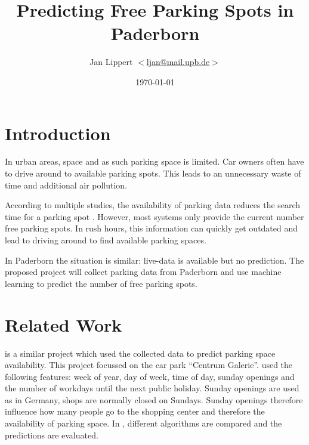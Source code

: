 \documentclass[journal,10pt]{IEEEtran}
\title{Predicting Free Parking Spots in Paderborn}
\author{Jan Lippert \(<\)\href{mailt:ljan@mail.upb.de}{ljan@mail.upb.de}\(>\)}
\date{\today}
\begin{document}
\maketitle

\section{Introduction}

In urban areas, space and as such parking space is limited. Car owners often have to drive around to available parking spots. This leads to an unnecessary waste of time and additional air pollution. 

According to multiple studies, the availability of parking data reduces the search time for a parking spot \cite{Asakura1994}\cite{Caicedo2010228}. However, most systems only provide the current number free parking spots. In rush hours, this information can quickly get outdated and lead to driving around to find available parking spaces.


In Paderborn the situation is similar: live-data is available but no prediction. The proposed project will collect parking data from Paderborn and use machine learning to predict the number of free parking spots.



\section{Related Work}

\cite{parkendd} is a similar project which used the collected data to predict parking space availability. This project focussed on the car park ``Centrum Galerie''. \cite{parkendd} used the following features: week of year, day of week, time of day, sunday openings and the number of workdays until the next public holiday. Sunday openings are used as in Germany, shops are normally closed on Sundays. Sunday openings therefore influence how many people go to the shopping center and therefore the availability of parking space. In \cite{parkendd}, different algorithms are compared and the predictions are evaluated.
\end{document}
